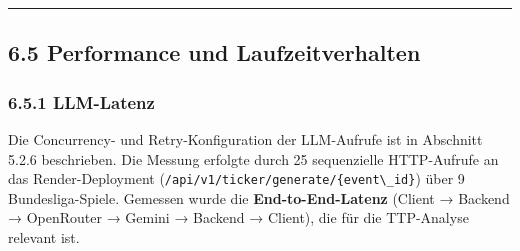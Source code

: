 \begin{center}\rule{0.5\linewidth}{0.5pt}\end{center}

\subsection{6.5 Performance und
Laufzeitverhalten}\label{performance-und-laufzeitverhalten}

\subsubsection{6.5.1 LLM-Latenz}\label{llm-latenz}

Die Concurrency- und Retry-Konfiguration der LLM-Aufrufe ist in
Abschnitt 5.2.6 beschrieben. Die Messung erfolgte durch 25 sequenzielle
HTTP-Aufrufe an das Render-Deployment
(\passthrough{\lstinline!/api/v1/ticker/generate/\{event\_id\}!}) über 9
Bundesliga-Spiele. Gemessen wurde die \textbf{End-to-End-Latenz} (Client
→ Backend → OpenRouter → Gemini → Backend → Client), die für die
TTP-Analyse relevant ist.


